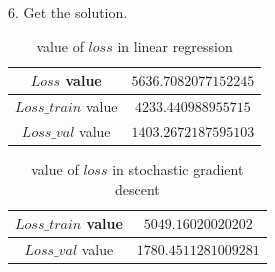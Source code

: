 \documentclass[journal, a4paper]{IEEEtran}
\begin{document}
\par
6. Get the solution.

	\begin{table}[!hbt]
		\begin{center}
		\caption{value of $loss$ in linear regression}
		\label{tab:simParameters}
		\begin{tabular}{|c|c|}
			\hline
			$Loss$ value& $5636.7082077152245$ \\
			\hline
			$Loss\_train$ value & $4233.440988955715$ \\
			\hline
			$Loss\_val$ value & $1403.2672187595103$\\
			\hline
		\end{tabular}
		\end{center}
	\end{table}

	\begin{table}[!hbt]
		\begin{center}
		\caption{value of $loss$ in stochastic gradient descent}
		\label{tab:simParameters}
		\begin{tabular}{|c|c|}
			\hline
			$Loss\_train$ value & $5049.16020020202$ \\
			\hline
			$Loss\_val$ value & $1780.4511281009281$\\
			\hline
		\end{tabular}
		\end{center}
	\end{table}
\end{document}
